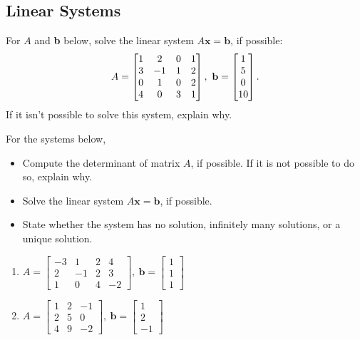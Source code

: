 \subsection{Linear Systems}



\BEN

\item
For $A$ and \textbf{b} below, solve the linear system $A\mathbf{x} = \mathbf{b}$, if possible:
\begin{align*}
 A = \BM
  1 & 2 & 0 & 1 \\
  3 & -1 & 1 & 2 \\
  0 & 1 & 0 & 2 \\
  4 & 0 & 3 & 1
 \EM, \ 
 \mathbf{b} = \BM 1 \\ 5 \\ 0 \\ 10 \EM.
\end{align*}
 If it isn't possible to solve this system, explain why. 

\item
For the systems below,
\begin{itemize}
\item Compute the determinant of matrix $A$, if possible. If it is not possible to do so, explain why. 
\item Solve the linear system $A\mathbf{x} = \mathbf{b}$, if possible. 
\item State whether the system has no solution, infinitely many solutions, or a unique solution.
\end{itemize}

\begin{enumerate}
\item \(
 A = \begin{bmatrix}
  -3 &  1 & 2 &  4 \\
   2 & -1 & 2 &  3 \\
   1 &  0 & 4 & -2
 \end{bmatrix}, \ 
 \mathbf{b} = \begin{bmatrix} 1 \\ 1 \\ 1 \end{bmatrix}
\)
\item \( A = \begin{bmatrix}
 1 & 2 & -1 \\
 2 & 5 & 0 \\
 4 & 9 & -2
\end{bmatrix} , \ 
 \mathbf{b} =
\begin{bmatrix} 1 \\ 2 \\ -1 \end{bmatrix} \)
\end{enumerate}

